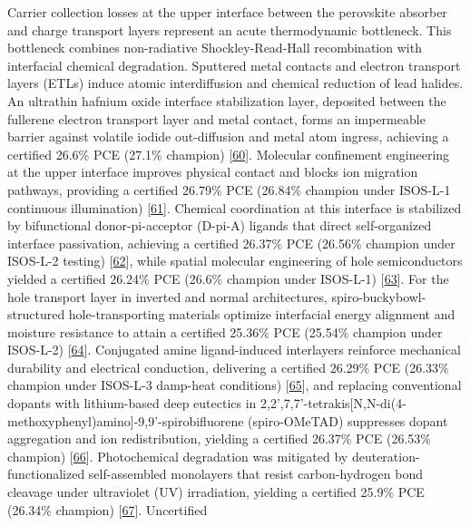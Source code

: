\documentclass[
  11pt,
]{article}
\begin{document}
Carrier collection losses at the upper interface between the perovskite
absorber and charge transport layers represent an acute thermodynamic
bottleneck. This bottleneck combines non-radiative Shockley-Read-Hall
recombination with interfacial chemical degradation. Sputtered metal
contacts and electron transport layers (ETLs) induce atomic
interdiffusion and chemical reduction of lead halides. An ultrathin
hafnium oxide interface stabilization layer, deposited between the
fullerene electron transport layer and metal contact, forms an
impermeable barrier against volatile iodide out-diffusion and metal atom
ingress, achieving a certified 26.6\% PCE (27.1\% champion)
{[}\href{https://doi.org/10.1126/science.aea3339}{60}{]}. Molecular
confinement engineering at the upper interface improves physical contact
and blocks ion migration pathways, providing a certified 26.79\% PCE
(26.84\% champion under ISOS-L-1 continuous illumination)
{[}\href{https://doi.org/10.1038/s41467-026-72115-2}{61}{]}. Chemical
coordination at this interface is stabilized by bifunctional
donor-pi-acceptor (D-pi-A) ligands that direct self-organized interface
passivation, achieving a certified 26.37\% PCE (26.56\% champion under
ISOS-L-2 testing) {[}\href{https://doi.org/10.1021/jacs.6c02548}{62}{]},
while spatial molecular engineering of hole semiconductors yielded a
certified 26.24\% PCE (26.6\% champion under ISOS-L-1)
{[}\href{https://doi.org/10.1002/anie.202523665}{63}{]}. For the hole
transport layer in inverted and normal architectures,
spiro-buckybowl-structured hole-transporting materials optimize
interfacial energy alignment and moisture resistance to attain a
certified 25.36\% PCE (25.54\% champion under ISOS-L-2)
{[}\href{https://doi.org/10.1002/anie.202525625}{64}{]}. Conjugated
amine ligand-induced interlayers reinforce mechanical durability and
electrical conduction, delivering a certified 26.29\% PCE (26.33\%
champion under ISOS-L-3 damp-heat conditions)
{[}\href{https://doi.org/10.1002/adma.73161}{65}{]}, and replacing
conventional dopants with lithium-based deep eutectics in
2,2',7,7'-tetrakis{[}N,N-di(4-methoxyphenyl)amino{]}-9,9'-spirobifluorene
(spiro-OMeTAD) suppresses dopant aggregation and ion redistribution,
yielding a certified 26.37\% PCE (26.53\% champion)
{[}\href{https://doi.org/10.1002/anie.9551164}{66}{]}. Photochemical
degradation was mitigated by deuteration-functionalized self-assembled
monolayers that resist carbon-hydrogen bond cleavage under ultraviolet
(UV) irradiation, yielding a certified 25.9\% PCE (26.34\% champion)
{[}\href{https://doi.org/10.1002/inf2.70140}{67}{]}. Uncertified
\end{document}
